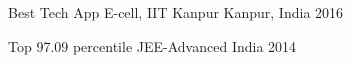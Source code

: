 
\begin{cvhonors}

  \cvhonor
    {Best Tech App} %
    {E-cell, IIT Kanpur} %
    {Kanpur, India} %
    {2016} %

  \cvhonor
    {Top 97.09 percentile} %
    {JEE-Advanced} %
    {India} %
    {2014} %


\end{cvhonors}
